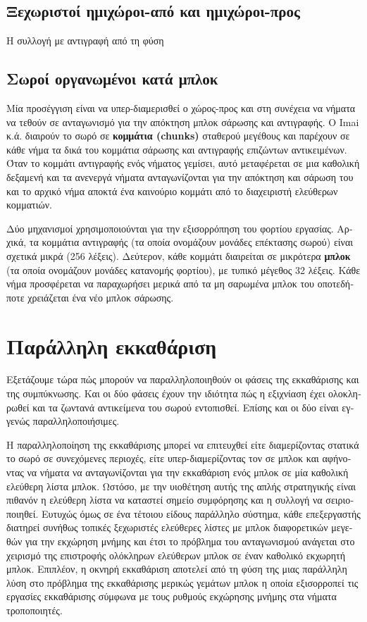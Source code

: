 \begin{greek}
 \subsection{Ξεχωριστοί ημιχώροι-από και ημιχώροι-προς}
 Η συλλογή με αντιγραφή από τη φύση
 \subsection{Σωροί οργανωμένοι κατά μπλοκ}
 Μία προσέγγιση είναι να υπερ-διαμερισθεί ο χώρος-προς και στη
 συνέχεια να νήματα να τεθούν σε ανταγωνισμό για την απόκτηση
 μπλοκ σάρωσης και αντιγραφής. Ο Imai κ.ά. \cite{DBLP:journals/tpds/ImaiT93}
 διαιρούν το σωρό σε \textbf{κομμάτια (chunks)} σταθερού μεγέθους
 και παρέχουν σε κάθε νήμα τα δικά του κομμάτια σάρωσης
 και αντιγραφής επιζώντων αντικειμένων. Όταν το κομμάτι αντιγραφής
 ενός νήματος γεμίσει, αυτό μεταφέρεται σε μια καθολική δεξαμενή
 και τα ανενεργά νήματα ανταγωνίζονται για την απόκτηση και
 σάρωση του και το αρχικό νήμα αποκτά ένα καινούριο κομμάτι
 από το διαχειριστή ελεύθερων κομματιών.

 Δύο μηχανισμοί χρησιμοποιούνται για την εξισορρόπηση του φορτίου
 εργασίας. Αρχικά, τα κομμάτια αντιγραφής (τα οποία ονομάζουν
 μονάδες επέκτασης σωρού) είναι σχετικά μικρά (256 λέξεις). Δεύτερον,
 κάθε κομμάτι διαιρείται σε μικρότερα \textbf{μπλοκ} (τα οποία
 ονομάζουν μονάδες κατανομής φορτίου), με τυπικό μέγεθος 32 λέξεις.
 Κάθε νήμα προσφέρεται να παραχωρήσει μερικά από τα μη σαρωμένα
 μπλοκ του οποτεδήποτε χρειάζεται ένα νέο μπλοκ σάρωσης.  
 
 \section{Παράλληλη εκκαθάριση}
 Εξετάζουμε τώρα πώς μπορούν να παραλληλοποιηθούν οι φάσεις
 της εκκαθάρισης και της συμπύκνωσης. Και οι δύο φάσεις έχουν την
 ιδιότητα πώς η εξιχνίαση έχει ολοκληρωθεί και τα ζωντανά αντικείμενα
 του σωρού εντοπισθεί. Επίσης και οι δύο είναι εγγενώς παραλληλοποιήσιμες.

 Η παραλληλοποίηση της εκκαθάρισης μπορεί να επιτευχθεί είτε διαμερίζοντας
 στατικά το σωρό σε συνεχόμενες περιοχές, είτε υπερ-διαμερίζοντας
 τον σε μπλοκ και αφήνοντας να νήματα να ανταγωνίζονται για την
 εκκαθάριση ενός μπλοκ σε μία καθολική ελεύθερη λίστα μπλοκ. Ωστόσο,
 με την υιοθέτηση αυτής της απλής στρατηγικής είναι πιθανόν η ελεύθερη
 λίστα να καταστεί σημείο συμφόρησης και η συλλογή να σειριοποιηθεί.
 Ευτυχώς όμως σε ένα τέτοιου είδους παράλληλο σύστημα, κάθε επεξεργαστής
 διατηρεί συνήθως τοπικές ξεχωριστές ελεύθερες λίστες με μπλοκ
 διαφορετικών μεγεθών για την εκχώρηση μνήμης και έτσι το πρόβλημα
 του ανταγωνισμού ανάγεται στο χειρισμό της επιστροφής ολόκληρων
 ελεύθερων μπλοκ σε έναν καθολικό εκχωρητή μπλοκ. Επιπλέον, η
 οκνηρή εκκαθάριση αποτελεί από τη φύση της μιας παράλληλη λύση
 στο πρόβλημα της εκκαθάρισης μερικώς γεμάτων μπλοκ η οποία εξισορροπεί
 τις εργασίες εκκαθάρισης σύμφωνα με τους ρυθμούς εκχώρησης μνήμης
 στα νήματα τροποποιητές.


\end{greek}
